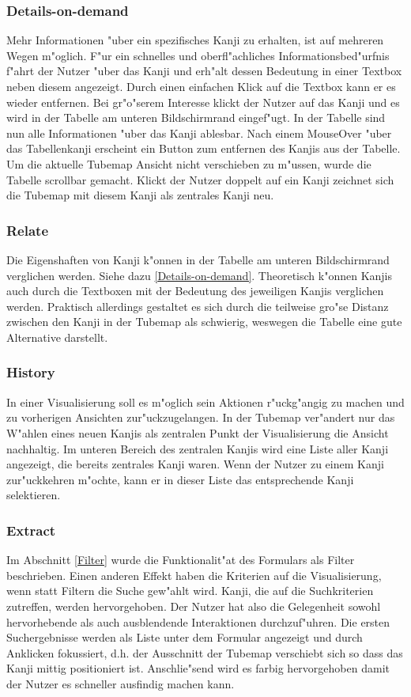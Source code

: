 \subsubsection{Details-on-demand}
Mehr Informationen "uber ein spezifisches Kanji zu erhalten, ist auf mehreren Wegen m"oglich. F"ur ein schnelles und oberfl"achliches Informationsbed"urfnis f"ahrt der Nutzer "uber das Kanji und erh"alt dessen Bedeutung in einer Textbox neben diesem angezeigt. Durch einen einfachen Klick auf die Textbox kann er es wieder entfernen. Bei gr"o"serem Interesse klickt der Nutzer auf das Kanji und es wird in der Tabelle am unteren Bildschirmrand eingef"ugt. In der Tabelle sind nun alle Informationen "uber das Kanji ablesbar. Nach einem MouseOver "uber das Tabellenkanji erscheint ein Button zum entfernen des Kanjis aus der Tabelle. Um die aktuelle Tubemap Ansicht nicht verschieben zu m"ussen, wurde die Tabelle scrollbar gemacht. Klickt der Nutzer doppelt auf ein Kanji zeichnet sich die Tubemap mit diesem Kanji als zentrales Kanji neu. 

\subsubsection{Relate}
Die Eigenshaften von Kanji k"onnen in der Tabelle am unteren Bildschirmrand verglichen werden. Siehe dazu \ref{Details-on-demand}. Theoretisch k"onnen Kanjis auch durch die Textboxen mit der Bedeutung des jeweiligen Kanjis verglichen werden. Praktisch allerdings gestaltet es sich durch die teilweise gro"se Distanz zwischen den Kanji in der Tubemap als schwierig, weswegen die Tabelle eine gute Alternative darstellt. 

\subsubsection{History}
In einer Visualisierung soll es m"oglich sein Aktionen r"uckg"angig zu machen und zu vorherigen Ansichten zur"uckzugelangen. In der Tubemap ver"andert nur das W"ahlen eines neuen Kanjis als zentralen Punkt der Visualisierung die Ansicht nachhaltig. Im unteren Bereich des zentralen Kanjis wird eine Liste aller Kanji angezeigt, die bereits zentrales Kanji waren. Wenn der Nutzer zu einem Kanji zur"uckkehren m"ochte, kann er in dieser Liste das entsprechende Kanji selektieren.


\subsubsection{Extract}
Im Abschnitt \ref{Filter} wurde die Funktionalit"at des Formulars als Filter beschrieben. Einen anderen Effekt haben die Kriterien auf die Visualisierung, wenn statt Filtern die Suche gew"ahlt wird. Kanji, die auf die Suchkriterien zutreffen, werden hervorgehoben. Der Nutzer hat also die Gelegenheit sowohl hervorhebende als auch ausblendende Interaktionen durchzuf"uhren. Die ersten Suchergebnisse werden als Liste unter dem Formular angezeigt und durch Anklicken fokussiert, d.h. der Ausschnitt der Tubemap verschiebt sich so dass das Kanji mittig positioniert ist. Anschlie"send  wird es farbig hervorgehoben damit der Nutzer es schneller ausfindig machen kann. 